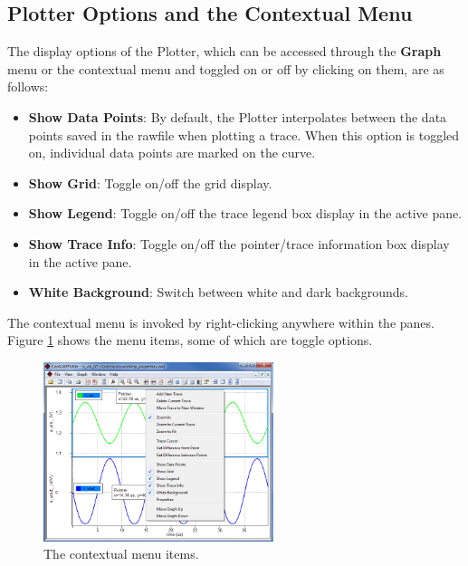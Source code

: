 \subsection{Plotter Options and the Contextual Menu}
\label{subsec_pane_plotteroptions}

The display options of the Plotter, which can be accessed through the \textsf{\textbf{Graph}} menu or the contextual menu and toggled on or off by clicking on them, are as follows:
\begin{itemize}
\item \textsf{\textbf{Show Data Points}}: By default, the Plotter interpolates between the data points saved in the rawfile when plotting a trace.  When this option is toggled on, individual data points are marked on the curve.
\item \textsf{\textbf{Show Grid}}: Toggle on/off the grid display.
\item \textsf{\textbf{Show Legend}}: Toggle on/off the trace legend box display in the active pane.
\item \textsf{\textbf{Show Trace Info}}: Toggle on/off the pointer/trace information box display in the active pane.
\item \textsf{\textbf{White Background}}: Switch between white and dark backgrounds.
\end{itemize}

The contextual menu is invoked by right-clicking anywhere within the panes.  Figure \ref{fig_plotter_contextualmenu} shows the menu items, some of which are toggle options.

\begin{figure}
    \includegraphics[width=0.6\textwidth]{./figures/plotter_netlist_editor_figures/Plotter_ContextualMenu.png}
    \caption{{The contextual menu items.}}
  \label{fig_plotter_contextualmenu}
\end{figure}

